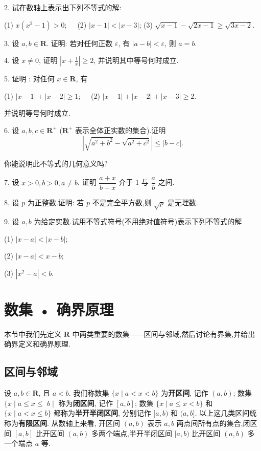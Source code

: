 2. 试在数轴上表示出下列不等式的解:

(1) $x\left(x^{2}-1\right)>0 ; \quad$ (2) $|x-1|<|x-3|$; (3) $\sqrt{x-1}-\sqrt{2 x-1} \geqslant \sqrt{3 x-2}$.

3. 设 $a, b \in \mathbf{R}$. 证明: 若对任何正数 $\varepsilon$, 有 $|a-b|<\varepsilon$, 则 $a=b$.

4. 设 $x \neq 0$, 证明 $\left|x+\frac{1}{x}\right| \geqslant 2$, 并说明其中等号何时成立.

5. 证明 : 对任何 $x \in \mathbf{R}$, 有

(1) $|x-1|+|x-2| \geqslant 1 ; \quad$ (2) $|x-1|+|x-2|+|x-3| \geqslant 2$.

并说明等号何时成立.

6. 设 $a, b, c \in \mathbf{R}^{+}$ ($\mathbf{R}^{+}$ 表示全体正实数的集合).证明
\[
\left|\sqrt{a^{2}+b^{2}}-\sqrt{a^{2}+c^{2}}\right| \leqslant|b-c| .
\]

你能说明此不等式的几何意义吗?

7. 设 $x>0, b>0, a \neq b$. 证明 $\dfrac{a+x}{b+x}$ 介于 1 与 $\dfrac{a}{b}$ 之间.

8. 设 $p$ 为正整数.证明: 若 $p$ 不是完全平方数,则 $\sqrt{p}$ 是无理数.

9. 设 $a, b$ 为给定实数.试用不等式符号(不用绝对值符号)表示下列不等式的解

(1) $|x-a|<|x-b|;$

(2) $|x-a|<x-b ;$

(3) $\left|x^{2}-a\right|<b.$

\section{数集 • 确界原理}

本节中我们先定义 $\mathbf{R}$ 中两类重要的数集——区间与邻域,然后讨论有界集,并给出确界定义和确界原理.

\subsection{区间与邻域}

设 $a, b \in \mathbf{R}$, 且 $a<b.$ 我们称数集 $\{x \mid a<x<b\}$ 为\textbf{开区间}, 记作 $(a, b)$; 数集 $\{x \mid a \leqslant x \leqslant$ $b \mid$ 称为\textbf{闭区间}, 记作 $[a, b] $; 数集 $\{x \mid a \leqslant x<b\}$ 和 $\{x \mid a<x \leqslant b\}$ 都称为\textbf{半开半闭区间}, 分别记作 $[a, b)$ 和 $(a, b].$ 以上这几类区间统称为\textbf{有限区间}. 从数轴上来看, 开区间 $(a, b)$ 表示 $a, b$ 两点间所有点的集合,闭区间 $[a, b]$ 比开区间 $(a, b)$ 多两个端点,半开半闭区间 $[a, b)$ 比开区间 $(a, b)$ 多一个端点 $a$ 等.

